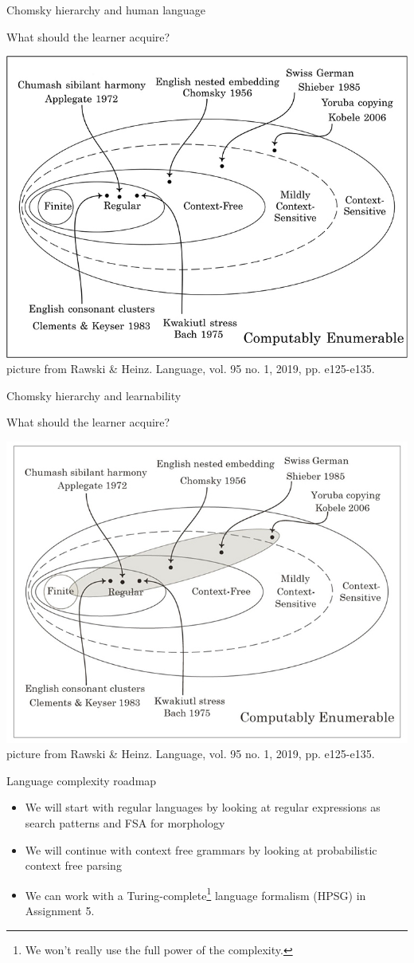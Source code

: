 \documentclass{beamer}
\begin{document}
\begin{frame}{Chomsky hierarchy and human language}

  What should the learner acquire?

  \vspace{0.2cm}
  \includegraphics[width=.8\textwidth]{figures/language-hierarchy}
  \tiny
  picture from Rawski \& Heinz. Language, vol. 95 no. 1, 2019, pp. e125-e135.
\end{frame}


\begin{frame}{Chomsky hierarchy and learnability}

  What should the learner acquire?

  \vspace{0.2cm}
  \includegraphics[width=.8\textwidth]{figures/fig03b}
  \tiny
  picture from Rawski \& Heinz. Language, vol. 95 no. 1, 2019, pp. e125-e135.
\end{frame}


\begin{frame}{Language complexity roadmap}
  \begin{itemize}
  \item We will start with regular languages by looking at regular
    expressions as search patterns and FSA for morphology 
  \item We will continue with context free grammars by looking at
    probabilistic context free parsing 
  \item We can work with a Turing-complete\footnote{We won't really
      use the full power of the complexity.} language formalism (HPSG)
    in Assignment 5.
  \end{itemize}
\end{frame}
\end{document}
